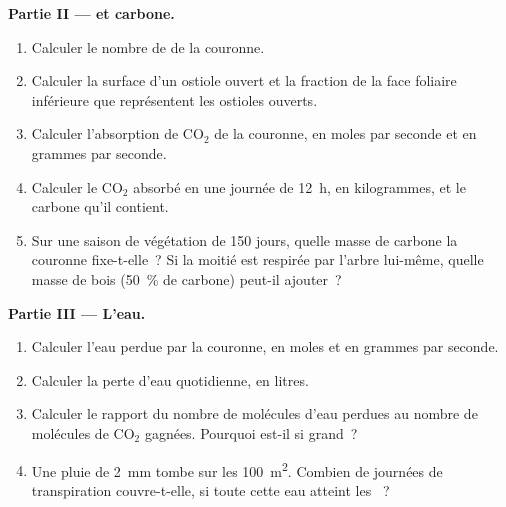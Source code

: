 \begin{problem}
\medskip
\noindent\textbf{Partie II ---  et carbone.}
\begin{enumerate}[resume]
  \item Calculer le nombre de  de la couronne.
  \item Calculer la surface d'un ostiole ouvert et la fraction de la
        face foliaire inférieure que représentent les ostioles ouverts.
  \item Calculer l'absorption de $\mathrm{CO_2}$ de la couronne, en
        moles par seconde et en grammes par seconde.
  \item Calculer le $\mathrm{CO_2}$ absorbé en une journée de
        \qty{12}{h}, en kilogrammes, et le carbone qu'il contient.
  \item Sur une saison de végétation de \qty{150}{} jours, quelle masse
        de carbone la couronne fixe-t-elle~? Si la moitié est respirée
        par l'arbre lui-même, quelle masse de bois (\qty{50}{\%} de
        carbone) peut-il ajouter~?
\end{enumerate}

\medskip
\noindent\textbf{Partie III --- L'eau.}
\begin{enumerate}[resume]
  \item Calculer l'eau perdue par la couronne, en moles et en grammes
        par seconde.
  \item Calculer la perte d'eau quotidienne, en litres.
  \item Calculer le rapport du nombre de molécules d'eau perdues au
        nombre de molécules de $\mathrm{CO_2}$ gagnées. Pourquoi est-il
        si grand~?
  \item Une pluie de \qty{2}{mm} tombe sur les \qty{100}{m^2}. Combien
        de journées de transpiration couvre-t-elle, si toute cette eau
        atteint les ~?
\end{enumerate}


\end{problem}
